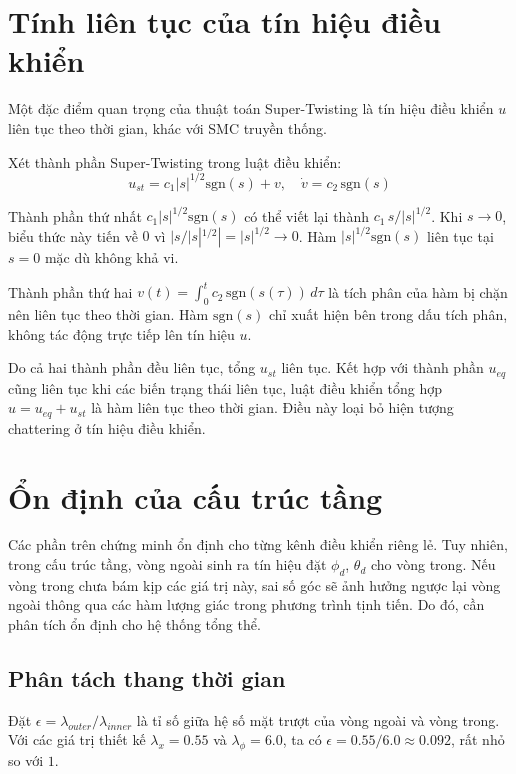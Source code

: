 \documentclass[12pt,a4paper]{report}
\begin{document}
\section{Tính liên tục của tín hiệu điều khiển}
Một đặc điểm quan trọng của thuật toán Super-Twisting là tín hiệu điều khiển $u$ liên tục theo thời gian, khác với SMC truyền thống.

Xét thành phần Super-Twisting trong luật điều khiển:
\begin{equation}
u_{st} = c_1 |s|^{1/2} \text{sgn}(s) + v, \quad \dot{v} = c_2 \, \text{sgn}(s)
\end{equation}

Thành phần thứ nhất $c_1 |s|^{1/2} \text{sgn}(s)$ có thể viết lại thành $c_1 \, s / |s|^{1/2}$. Khi $s \to 0$, biểu thức này tiến về $0$ vì $|s / |s|^{1/2}| = |s|^{1/2} \to 0$. Hàm $|s|^{1/2} \text{sgn}(s)$ liên tục tại $s = 0$ mặc dù không khả vi.

Thành phần thứ hai $v(t) = \int_0^t c_2 \, \text{sgn}(s(\tau)) \, d\tau$ là tích phân của hàm bị chặn nên liên tục theo thời gian. Hàm $\text{sgn}(s)$ chỉ xuất hiện bên trong dấu tích phân, không tác động trực tiếp lên tín hiệu $u$.

Do cả hai thành phần đều liên tục, tổng $u_{st}$ liên tục. Kết hợp với thành phần $u_{eq}$ cũng liên tục khi các biến trạng thái liên tục, luật điều khiển tổng hợp $u = u_{eq} + u_{st}$ là hàm liên tục theo thời gian. Điều này loại bỏ hiện tượng chattering ở tín hiệu điều khiển.

\section{Ổn định của cấu trúc tầng}
Các phần trên chứng minh ổn định cho từng kênh điều khiển riêng lẻ. Tuy nhiên, trong cấu trúc tầng, vòng ngoài sinh ra tín hiệu đặt $\phi_d$, $\theta_d$ cho vòng trong. Nếu vòng trong chưa bám kịp các giá trị này, sai số góc sẽ ảnh hưởng ngược lại vòng ngoài thông qua các hàm lượng giác trong phương trình tịnh tiến. Do đó, cần phân tích ổn định cho hệ thống tổng thể.

\subsection{Phân tách thang thời gian}
Đặt $\epsilon = \lambda_{outer} / \lambda_{inner}$ là tỉ số giữa hệ số mặt trượt của vòng ngoài và vòng trong. Với các giá trị thiết kế $\lambda_x = 0.55$ và $\lambda_\phi = 6.0$, ta có $\epsilon = 0.55 / 6.0 \approx 0.092$, rất nhỏ so với $1$.
\end{document}
